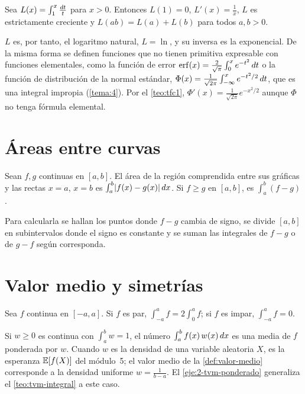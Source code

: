 \begin{proposicion}\label{prop:logaritmo}
Sea $L(x)=\int_1^x\frac{\mathop{}\!d t}{t}$ para $x>0$. Entonces $L(1)=0$, $L'(x)=\frac1x$, $L$ es estrictamente creciente y $L(ab)=L(a)+L(b)$ para todos $a,b>0$.
\end{proposicion}

$L$ es, por tanto, el logaritmo natural, $L=\ln$, y su inversa es la exponencial. De la misma forma se definen funciones que no tienen primitiva expresable con funciones elementales, como la función de error $\operatorname{erf}(x)=\frac{2}{\sqrt\pi}\int_0^x e^{-t^{2}}\mathop{}\!d t$ o la función de distribución de la normal estándar, $\Phi(x)=\frac{1}{\sqrt{2\pi}}\int_{-\infty}^{x}e^{-t^{2}/2}\mathop{}\!d t$, que es una integral impropia (\cref{tema:4}). Por el \cref{teo:tfc1}, $\Phi'(x)=\frac{1}{\sqrt{2\pi}}e^{-x^{2}/2}$ aunque $\Phi$ no tenga fórmula elemental.

\section{Áreas entre curvas}

\begin{definicion}\label{def:area}
Sean $f,g$ continuas en $[a,b]$. El área de la región comprendida entre sus gráficas y las rectas $x=a$, $x=b$ es $\int_a^b\lvert f(x)-g(x)\rvert\mathop{}\!d x$. Si $f\ge g$ en $[a,b]$, es $\int_a^b(f-g)$.
\end{definicion}

Para calcularla se hallan los puntos donde $f-g$ cambia de signo, se divide $[a,b]$ en subintervalos donde el signo es constante y se suman las integrales de $f-g$ o de $g-f$ según corresponda.

\addtocounter{definicion}{1}%

\addtocounter{definicion}{1}%

\section{Valor medio y simetrías}

\addtocounter{definicion}{1}%

\begin{proposicion}\label{prop:par-impar}
Sea $f$ continua en $[-a,a]$. Si $f$ es par, $\int_{-a}^{a}f=2\int_0^{a}f$; si $f$ es impar, $\int_{-a}^{a}f=0$.
\end{proposicion}

\begin{observacion}
Si $w\ge0$ es continua con $\int_a^b w=1$, el número $\int_a^b f(x)\,w(x)\mathop{}\!d x$ es una media de $f$ ponderada por $w$. Cuando $w$ es la densidad de una variable aleatoria $X$, es la esperanza $\mathbb{E}[f(X)]$ del módulo~5; el valor medio de la \cref{def:valor-medio} corresponde a la densidad uniforme $w=\frac{1}{b-a}$. El \cref{eje:2-tvm-ponderado} generaliza el \cref{teo:tvm-integral} a este caso.
\end{observacion}

\addtocounter{definicion}{1}%

\addtocounter{definicion}{1}%

